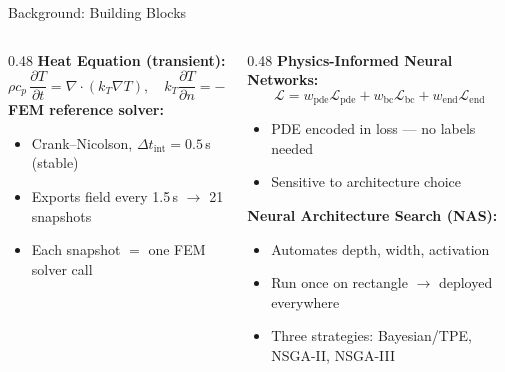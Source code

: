 \documentclass[aspectratio=169, 11pt]{beamer}
\begin{document}
\begin{frame}{Background: Building Blocks}
  \begin{columns}[t]
    \begin{column}{0.48\textwidth}
      \textbf{Heat Equation (transient):}
      \[
        \rho c_p\,\frac{\partial T}{\partial t}
        = \nabla\!\cdot\!(k_T\nabla T),
        \quad
        k_T\frac{\partial T}{\partial n} = -h(T-T_w)
      \]
      \smallskip
      \textbf{FEM reference solver:}
      \begin{itemize}
        \item Crank--Nicolson, $\Delta t_\text{int}=0.5$\,s (stable)
        \item Exports field every 1.5\,s $\to$ 21 snapshots
        \item Each snapshot $=$ one FEM solver call
      \end{itemize}
    \end{column}
    \begin{column}{0.48\textwidth}
      \textbf{Physics-Informed Neural Networks:}
      \[
        \mathcal{L} =
        w_\text{pde}\mathcal{L}_\text{pde}
        + w_\text{bc}\mathcal{L}_\text{bc}
        + w_\text{end}\mathcal{L}_\text{end}
      \]
      \begin{itemize}
        \item PDE encoded in loss — no labels needed
        \item Sensitive to architecture choice
      \end{itemize}
      \smallskip
      \textbf{Neural Architecture Search (NAS):}
      \begin{itemize}
        \item Automates depth, width, activation
        \item Run once on rectangle $\to$ deployed everywhere
        \item Three strategies: Bayesian/TPE, NSGA-II, NSGA-III
      \end{itemize}
    \end{column}
  \end{columns}
\end{frame}
\end{document}
